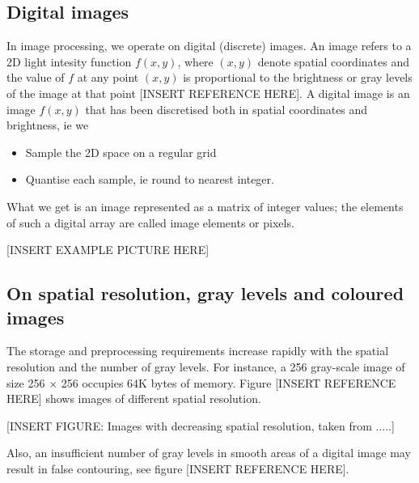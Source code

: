 \subsection{Digital images}

In image processing, we operate on digital (discrete) images.
An image refers to a 2D light intesity function \( f(x,y) \), where \( (x,y) \) denote spatial coordinates and the value of \( f \) at any point \( (x,y) \) is proportional to the brightness or gray levels of the image at that point [INSERT REFERENCE HERE].
A digital image is an image \( f(x,y)  \) that has been discretised both in spatial coordinates and brightness, ie we

\begin{itemize}
	\item Sample the 2D space on a regular grid
	\item Quantise each sample, ie round to nearest integer.
\end{itemize}

What we get is an image represented as a matrix of integer values; the elements of such a digital array are called image elements or pixels.


[INSERT EXAMPLE PICTURE HERE]


\subsection{On spatial resolution, gray levels and coloured images}

The storage and preprocessing requirements increase rapidly with the spatial resolution and the number of gray levels. 
For instance, a 256 gray-scale image of size 256 \( \times \) 256 occupies 64K bytes of memory. Figure [INSERT REFERENCE HERE] shows images of different spatial resolution. 

[INSERT FIGURE: Images with decreasing spatial resolution, taken from .....]

Also, an insufficient number of gray levels in smooth areas of a digital image may result in false contouring, see figure [INSERT REFERENCE HERE].


